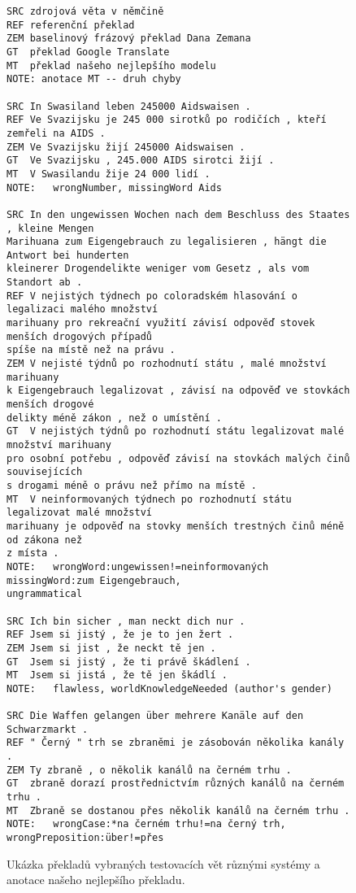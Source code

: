 \documentclass[a4]{article}
\begin{document}
\begin{figure}[t]
\centering
\begin{verbatim}
SRC	zdrojová věta v němčině
REF referenční překlad
ZEM	baselinový frázový překlad Dana Zemana
GT	překlad Google Translate  
MT	překlad našeho nejlepšího modelu
NOTE: anotace MT -- druh chyby

SRC In Swasiland leben 245000 Aidswaisen .
REF Ve Svazijsku je 245 000 sirotků po rodičích , kteří zemřeli na AIDS .
ZEM Ve Svazijsku žijí 245000 Aidswaisen .
GT  Ve Svazijsku , 245.000 AIDS sirotci žijí .
MT  V Swasilandu žije 24 000 lidí .
NOTE:   wrongNumber, missingWord Aids

SRC In den ungewissen Wochen nach dem Beschluss des Staates , kleine Mengen
Marihuana zum Eigengebrauch zu legalisieren , hängt die Antwort bei hunderten
kleinerer Drogendelikte weniger vom Gesetz , als vom Standort ab .
REF V nejistých týdnech po coloradském hlasování o legalizaci malého množství
marihuany pro rekreační využití závisí odpověď stovek menších drogových případů
spíše na místě než na právu .
ZEM V nejisté týdnů po rozhodnutí státu , malé množství marihuany
k Eigengebrauch legalizovat , závisí na odpověď ve stovkách menších drogové
delikty méně zákon , než o umístění .
GT  V nejistých týdnů po rozhodnutí státu legalizovat malé množství marihuany
pro osobní potřebu , odpověď závisí na stovkách malých činů souvisejících
s drogami méně o právu než přímo na místě .
MT  V neinformovaných týdnech po rozhodnutí státu legalizovat malé množství
marihuany je odpověď na stovky menších trestných činů méně od zákona než
z místa .
NOTE:   wrongWord:ungewissen!=neinformovaných missingWord:zum Eigengebrauch,
ungrammatical

SRC Ich bin sicher , man neckt dich nur .
REF Jsem si jistý , že je to jen žert .
ZEM Jsem si jist , že neckt tě jen .
GT  Jsem si jistý , že ti právě škádlení .
MT  Jsem si jistá , že tě jen škádlí .
NOTE:   flawless, worldKnowledgeNeeded (author's gender)

SRC Die Waffen gelangen über mehrere Kanäle auf den Schwarzmarkt .
REF " Černý " trh se zbraněmi je zásobován několika kanály .
ZEM Ty zbraně , o několik kanálů na černém trhu .
GT  zbraně dorazí prostřednictvím různých kanálů na černém trhu .
MT  Zbraně se dostanou přes několik kanálů na černém trhu .
NOTE:   wrongCase:*na černém trhu!=na černý trh, wrongPreposition:über!=přes
\end{verbatim}
\caption{Ukázka překladů vybraných testovacích vět různými systémy a anotace našeho nejlepšího překladu.}
\label{fig:preklad}
\end{figure}
\end{document}
